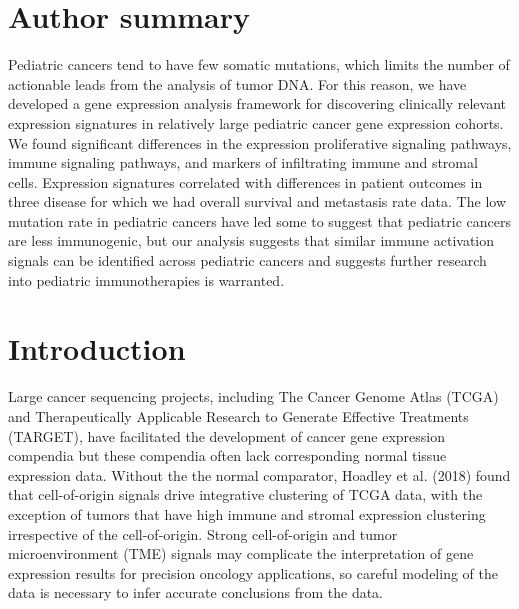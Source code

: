 \documentclass[10pt,letterpaper]{article}
\begin{document}
\section*{Author summary}
Pediatric cancers tend to have few somatic mutations, which limits the number of actionable leads from the analysis of tumor DNA. For this reason, we have developed a gene expression analysis framework for discovering clinically relevant expression signatures in relatively large pediatric cancer gene expression cohorts. We found significant differences in the expression proliferative signaling pathways, immune signaling pathways, and markers of infiltrating immune and stromal cells. Expression signatures correlated with differences in patient outcomes in three disease for which we had overall survival and metastasis rate data. The low mutation rate in pediatric cancers have led some to suggest that pediatric cancers are less immunogenic, but our analysis suggests that similar immune activation signals can be identified across pediatric cancers and suggests further research into pediatric immunotherapies is warranted.

\linenumbers

\section*{Introduction}
Large cancer sequencing projects, including The Cancer Genome Atlas (TCGA) and Therapeutically Applicable Research to Generate Effective Treatments (TARGET), have facilitated the development of cancer gene expression compendia \cite{vivianToilEnablesReproducible2017, pughGeneticLandscapeHighrisk2013, goldmanUCSCXenaPlatform2018, thecancergenomeatlasresearchnetworkCancerGenomeAtlas2013, newtonTumorMapExploringMolecular2017} but these compendia often lack corresponding normal tissue expression data. Without the the normal comparator, Hoadley et al. (2018) found that cell-of-origin signals drive integrative clustering of TCGA data, with the exception of tumors that have high immune and stromal expression clustering irrespective of the cell-of-origin. Strong cell-of-origin and tumor microenvironment (TME) signals may complicate the interpretation of gene expression results for precision oncology applications, so careful modeling of the data is necessary to infer accurate conclusions from the data. 
\end{document}
